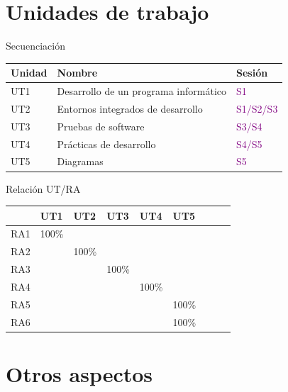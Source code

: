 \documentclass{beamer}
\begin{document}
\section{Unidades de trabajo}

\begin{frame}{Secuenciación}
    \begin{tabular}{|l|l|l|}
        \hline
        \textbf{Unidad} & \textbf{Nombre} & \textbf{Sesión}\\
        \hline
        UT1 & Desarrollo de un programa informático & \textcolor{purple}{S1}\\
        \hline
        UT2 & Entornos integrados de desarrollo & \textcolor{purple}{S1/S2/S3}\\
        \hline
        UT3 & Pruebas de software & \textcolor{purple}{S3/S4}\\
        \hline
        UT4 & Prácticas de desarrollo& \textcolor{purple}{S4/S5}\\
        \hline
        UT5 & Diagramas & \textcolor{purple}{S5}\\
        \hline
    \end{tabular}
\end{frame}

\begin{frame}{Relación UT/RA}
    \begin{tabular}{|l|l|l|l|l|l|l|l|l|}
        \hline
            & UT1  & UT2  & UT3  & UT4  & UT5\\
        \hline
        RA1 & 100\% &  &  & & \\
        \hline
        RA2 & &  100\% &  & & \\
        \hline
        RA3 & &  & 100\%  & & \\
        \hline
        RA4 & &  & & 100\% & \\
        \hline
        RA5 & &  & & & 100\% \\
        \hline
        RA6 & &  & & & 100\% \\
        \hline
    \end{tabular}
\end{frame}

\section{Otros aspectos}
\end{document}
